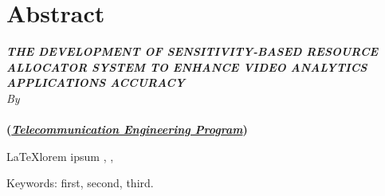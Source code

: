 \clearpage
\chapter*{Abstract}

\begin{center}
	\linespread{1}
	\large{\bfseries{
			\MakeUppercase{\textit{The Development of Sensitivity-based Resource Allocator 
			System to Enhance Video Analytics Applications Accuracy}}
		}
	}\\[1\baselineskip]
	\normalsize{\textit{By}\\}
	\large{ 
		\bfseries \theauthor\\
		(\textit{\underline{Telecommunication Engineering Program}})
	}\\[2\baselineskip]
\end{center}

\medskip

\begin{spacing}{1.0}
	
	\LaTeX lorem ipsum \cite{dds}, \cite{videostorm}, \cite{concierge}
	\itshape{
		\blindtext
		
		\blindtext
		
		Keywords: first, second, third.
	}
\end{spacing}

\clearpage
